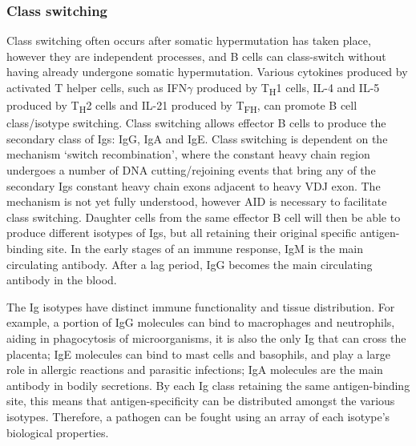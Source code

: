 \subsubsection{Class switching}
Class switching often occurs after somatic hypermutation has taken place, however they are independent processes, and B cells can class-switch without having already undergone somatic hypermutation\cite{mak2014b}.
Various cytokines produced by activated T helper cells, such as IFN$\gamma$ produced by T\textsubscript{H}1 cells, IL-4 and IL-5 produced by T\textsubscript{H}2 cells and IL-21 produced by T\textsubscript{FH}, can promote B cell class/isotype switching.
Class switching allows effector B cells to produce the secondary class of Igs: IgG, IgA and IgE\@.
Class switching is dependent on the mechanism `switch recombination', where the constant heavy chain region undergoes a number of DNA cutting/rejoining events that bring any of the secondary Igs constant heavy chain exons adjacent to heavy VDJ exon\cite{mak2014b}.
The mechanism is not yet fully understood, however AID is necessary to facilitate class switching.
Daughter cells from the same effector B cell will then be able to produce different isotypes of Igs, but all retaining their original specific antigen-binding site.
In the early stages of an immune response, IgM is the main circulating antibody.
After a lag period, IgG becomes the main circulating antibody in the blood\cite{alberts2007molecularimmune}.

The Ig isotypes have distinct immune functionality and tissue distribution.
For example, a portion of IgG molecules can bind to macrophages and neutrophils, aiding in phagocytosis of microorganisms, it is also the only Ig that can cross the placenta; IgE molecules can bind to mast cells and basophils, and play a large role in allergic reactions and parasitic infections; IgA molecules are the main antibody in bodily secretions\cite{alberts2007molecularimmune}.
By each Ig class retaining the same antigen-binding site, this means that antigen-specificity can be distributed amongst the various isotypes.
Therefore, a pathogen can be fought using an array of each isotype's biological properties\cite{xu2012immunoglobulin}.


